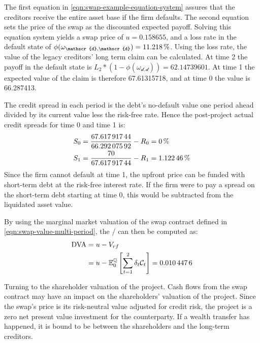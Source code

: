 \documentclass[main.tex]{subfiles}
\begin{document}
        The first equation in \cref{eqn:swap-example-equation-system} assures that the creditors receive the entire asset base if the firm defaults.
        The second equation sets the price of the swap as the discounted expected payoff.
        Solving this equation system yields a swap price of $u=\num{0.158655}$,
        and a loss rate in the default state of 
        $\phi(\omega_{\mathscr{d},\mathscr{d}})=\pct{0.112180}$.
        Using the loss rate, the value of the legacy creditors' long term claim can be calculated.
        At time 2 the payoff in the default state is 
        $L_{2}*(1-\phi(\omega_{\mathscr{d},\mathscr{d}})) = \num{62.14739601}$.
        At time 1 the expected value of the claim is therefore \num{67.61315718},
        and at time 0 the value is \num{66.287413}.

        The credit spread in each period is the debt's no-default value one period ahead
        divided by its current value less the risk-free rate.
        Hence the post-project actual credit spreads for time 0 and time 1 is:
        \begin{align}
            S_{0} 
            &=
            \frac{
                \num{67.61791744}
            }{
                \num{66.29207592}
            }
            -
            R_{0}
            =
            \pct{0}
            \\
            S_{1} 
            &= 
            \frac{
                \num{70}
            }{
                \num{67.61791744}
            } 
            -
            R_{1}
            =
            \pct{0.0112246}
        \end{align}
        Since the firm cannot default at time 1,
        the upfront price can be funded with short-term debt at the risk-free interest rate.
        If the firm were to pay a spread on the short-term debt starting at time 0,
        this would be subtracted from the liquidated asset value. 

        By using the marginal market valuation of the swap contract
        defined in \cref{eqn:swap-value-multi-period},
        the \DVA/ can then be computed as:
        \begin{align}
            \DVA/ &= u - V_{rf}
            \nonumber
            \\
            &= u - \mathbb{E}_{0}^{\rnmeasure}\left[\sum_{t=1}^{2}\delta_t \mathcal{C}_t\right]
            = \num{0.0104476}
        \end{align}

        Turning to the shareholder valuation of the project.
        Cash flows from the swap contract may have an impact on the shareholders' valuation of the project.
        Since the swap's price is its risk-neutral value adjusted for credit risk,
        the project is a zero net present value investment for the counterparty.
        If a wealth transfer has happened, it is bound to be between the shareholders and the long-term creditors.
\end{document}
